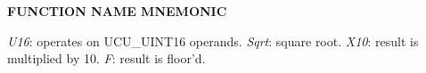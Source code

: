 \noindent\textbf{FUNCTION NAME MNEMONIC}
\begin{list}{}{\setlength{\leftmargin}{0.25in}\setlength{\topsep}{0.0in}}
\item \emph{U16}:   operates on UCU\_UINT16 operands.
      \emph{Sqrt}:  square root.
      \emph{X10}:   result is multiplied by 10.
      \emph{F}:     result is floor'd.
\end{list}


%
%
%
%
%
